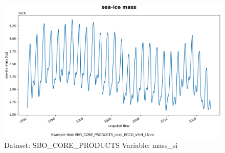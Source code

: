 \begin{figure}[H]
\centering
\includegraphics[scale=0.55]{../images/plots/oneD_plots/SBO_Core_Products/mass_si.png}
\caption{Dataset: SBO\_CORE\_PRODUCTS Variable: mass\_si}
\label{tab:table-SBO_CORE_PRODUCTS_mass_si-Plot}
\end{figure}
\pagebreak
